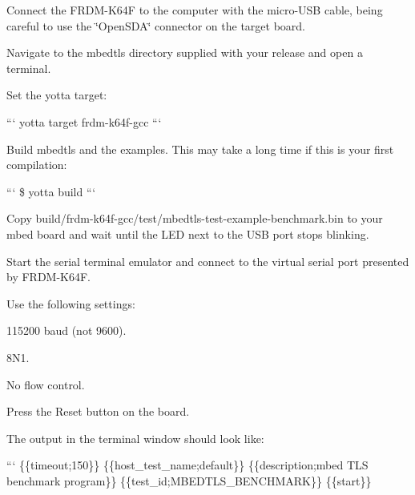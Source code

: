 \begin{DoxyEnumerate}
\item Connect the F\-R\-D\-M-\/\-K64\-F to the computer with the micro-\/\-U\-S\-B cable, being careful to use the \char`\"{}\-Open\-S\-D\-A\char`\"{} connector on the target board.
\item Navigate to the mbedtls directory supplied with your release and open a terminal.
\item Set the yotta target\-:

``` yotta target frdm-\/k64f-\/gcc ```
\item Build mbedtls and the examples. This may take a long time if this is your first compilation\-:

``` \$ yotta build ```
\item Copy {\ttfamily build/frdm-\/k64f-\/gcc/test/mbedtls-\/test-\/example-\/benchmark.\-bin} to your mbed board and wait until the L\-E\-D next to the U\-S\-B port stops blinking.
\item Start the serial terminal emulator and connect to the virtual serial port presented by F\-R\-D\-M-\/\-K64\-F.

Use the following settings\-:
\begin{DoxyItemize}
\item 115200 baud (not 9600).
\item 8\-N1.
\item No flow control.
\end{DoxyItemize}
\item Press the Reset button on the board.
\item The output in the terminal window should look like\-:

``` \{\{timeout;150\}\} \{\{host\-\_\-test\-\_\-name;default\}\} \{\{description;mbed T\-L\-S benchmark program\}\} \{\{test\-\_\-id;M\-B\-E\-D\-T\-L\-S\-\_\-\-B\-E\-N\-C\-H\-M\-A\-R\-K\}\} \{\{start\}\}
\end{DoxyEnumerate}


